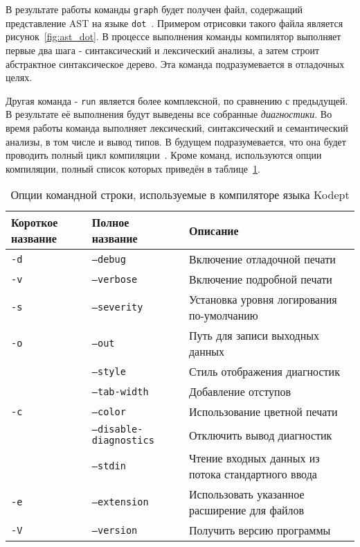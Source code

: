 В результате работы команды \lstinline{graph} будет получен файл, содержащий представление AST на языке \lstinline{dot}~\cite{Dot}.
Примером отрисовки такого файла является рисунок~\ref{fig:ast_dot}.
В процессе выполнения команды компилятор выполняет первые два шага - синтаксический и лексический анализы, а затем строит абстрактное синтаксическое дерево.
Эта команда подразумевается в отладочных целях.

Другая команда - \lstinline{run} является более комплексной, по сравнению с предыдущей.
В результате её выполнения будут выведены все собранные \textit{диагностики}.
Во время работы команда выполняет лексический, синтаксический и семантический анализы, в том числе и вывод типов.
В будущем подразумевается, что она будет проводить полный цикл компиляции~.
Кроме команд, используются опции компиляции, полный список которых приведён в таблице~\ref{tab:flags}.

\begin{table}[H]
    \centering
    \caption{Опции командной строки, используемые в компиляторе языка Kodept}
    \label{tab:flags}
    \begin{tabular}{|p{25mm}|p{}|p{}|}
        \hline
        \textbf{Короткое название} & \textbf{Полное название}       & \textbf{Описание}                                  \\\hline
        \texttt{-d}                & \texttt{--debug}               & Включение отладочной печати                        \\\hline
        \texttt{-v}                & \texttt{--verbose}             & Включение подробной печати                         \\\hline
        \texttt{-s}                & \texttt{--severity}            & Установка уровня логирования по-умолчанию          \\\hline
        \texttt{-o}                & \texttt{--out}                 & Путь для записи выходных данных                    \\\hline
        & \texttt{--style}               & Стиль отображения диагностик                       \\\hline
        & \texttt{--tab-width}           & Добавление отступов                                \\\hline
        \texttt{-c}                & \texttt{--color}               & Использование цветной печати                       \\\hline
        & \texttt{--disable-diagnostics} & Отключить вывод диагностик                         \\\hline
        & \texttt{--stdin}               & Чтение входных данных из потока стандартного ввода \\\hline
        \texttt{-e}                & \texttt{--extension}           & Использовать указанное расширение для файлов       \\\hline
        \texttt{-V}                & \texttt{--version}             & Получить версию программы                          \\\hline
    \end{tabular}
\end{table}

